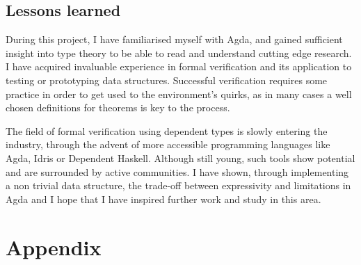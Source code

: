 \documentclass[12pt,twoside,notitlepage]{report}
\begin{document}
\section{Lessons learned}

During this project, I have familiarised myself with Agda, and gained sufficient insight into type theory to be able to read and understand cutting edge research. I have acquired invaluable experience in formal verification and its application to testing or prototyping data structures. 
Successful verification requires some practice in order to get used to the environment's quirks, as in many cases a well chosen definitions for theorems is key to the process. 

The field of formal verification using dependent types is slowly entering the industry, through the advent of more accessible programming languages like Agda, Idris or Dependent Haskell. Although still young, such tools show potential and are surrounded by active communities. I have shown, through implementing a non trivial data structure, the trade-off between expressivity and limitations in Agda and I hope that I have inspired further work and study in this area.







\chapter{Appendix}
\end{document}
